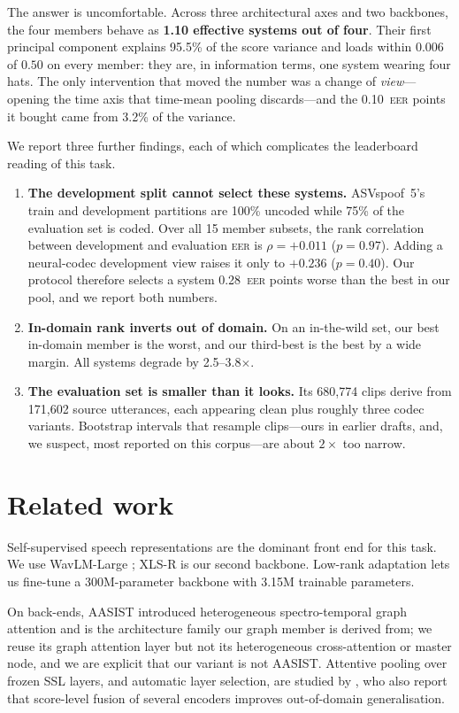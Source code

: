 \documentclass[11pt,a4paper]{article}
\newcommand{\eer}{\textsc{eer}}
\begin{document}
The answer is uncomfortable. Across three architectural axes and two backbones, the four members
behave as \textbf{1.10 effective systems out of four}. Their first principal component explains
95.5\% of the score variance and loads within 0.006 of $0.50$ on every member: they are, in
information terms, one system wearing four hats. The only intervention that moved the number was a
change of \emph{view}---opening the time axis that time-mean pooling discards---and the 0.10~\eer{}
points it bought came from 3.2\% of the variance.

We report three further findings, each of which complicates the leaderboard reading of this task.

\begin{enumerate}\itemsep2pt
\item \textbf{The development split cannot select these systems.} ASVspoof~5's train and development
partitions are 100\% uncoded while 75\% of the evaluation set is coded. Over all 15 member subsets,
the rank correlation between development and evaluation \eer{} is $\rho = +0.011$ ($p=0.97$). Adding
a neural-codec development view raises it only to $+0.236$ ($p=0.40$). Our protocol therefore selects
a system 0.28~\eer{} points worse than the best in our pool, and we report both numbers.
\item \textbf{In-domain rank inverts out of domain.} On an in-the-wild set, our best in-domain
member is the worst, and our third-best is the best by a wide margin. All systems degrade by
2.5--3.8$\times$.
\item \textbf{The evaluation set is smaller than it looks.} Its 680{,}774 clips derive from 171{,}602
source utterances, each appearing clean plus roughly three codec variants. Bootstrap intervals that
resample clips---ours in earlier drafts, and, we suspect, most reported on this corpus---are about
$2\times$ too narrow.
\end{enumerate}

\section{Related work}

Self-supervised speech representations are the dominant front end for this task. We use
WavLM-Large \citep{wavlm}; XLS-R \citep{xlsr} is our second backbone. Low-rank adaptation
\citep{lora} lets us fine-tune a 300M-parameter backbone with 3.15M trainable parameters.

On back-ends, AASIST \citep{aasist} introduced heterogeneous spectro-temporal graph attention and is
the architecture family our graph member is derived from; we reuse its graph attention layer but not
its heterogeneous cross-attention or master node, and we are explicit that our variant is not AASIST.
Attentive pooling over frozen SSL layers, and automatic layer selection, are studied by
\citet{serrano2025}, who also report that score-level fusion of several encoders improves
out-of-domain generalisation.
\end{document}

